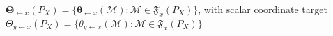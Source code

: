 \(\boldsymbol\Theta_{\leftarrow x}(P_X)=\{\boldsymbol\theta_{\leftarrow x}(\mathcal M):\mathcal M\in\mathfrak F_x(P_X)\}\), with scalar coordinate target \(\Theta_{y\leftarrow x}(P_X)=\{\theta_{y\leftarrow x}(\mathcal M):\mathcal M\in\mathfrak F_x(P_X)\}\)